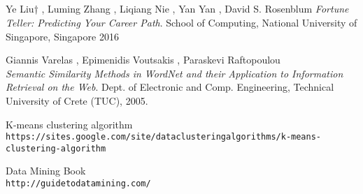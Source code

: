 \documentclass[journal]{IEEEtran}
\begin{document}
\\
\\
\\
\\\begin{thebibliography}{9}

Ye Liu† , Luming Zhang , Liqiang Nie , Yan Yan , David S. Rosenblum
\textit{Fortune Teller: Predicting Your Career Path}. 
School of Computing, National University of Singapore, Singapore 2016
 
Giannis Varelas , Epimenidis Voutsakis , Paraskevi Raftopoulou  
\\\textit{Semantic Similarity Methods in WordNet and their
Application to Information Retrieval on the Web}. 
Dept. of Electronic and Comp. Engineering, Technical University of Crete (TUC),  2005.
 
K-means clustering algorithm
\\\texttt{https://sites.google.com/site/dataclusteringalgorithms/k-means-clustering-algorithm}

Data Mining Book
\\\texttt{http://guidetodatamining.com/}
\end{thebibliography}
\end{document}
